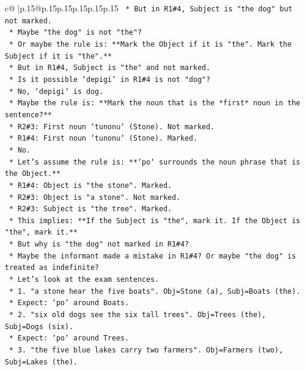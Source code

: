 \documentclass{article}
\begin{document}
{\begin{supertabular}{c@{$\;$}|p{.15\linewidth}@{}p{.15\linewidth}p{.15\linewidth}p{.15\linewidth}p{.15\linewidth}p{.15\linewidth}}
{{{\texttt{        *   But in R1\#4, Subject is "the dog" but not marked.} \\
\texttt{        *   Maybe "the dog" is not "the"?} \\
\texttt{        *   Or maybe the rule is: **Mark the Object if it is "the". Mark the Subject if it is "the".**} \\
\texttt{        *   But in R1\#4, Subject is "the" and not marked.} \\
\texttt{        *   Is it possible `depigi` in R1\#4 is not "dog"?} \\
\texttt{        *   No, `depigi` is dog.} \\
\texttt{        *   Maybe the rule is: **Mark the noun that is the *first* noun in the sentence?**} \\
\texttt{        *   R2\#3: First noun `tunonu` (Stone). Not marked.} \\
\texttt{        *   R1\#4: First noun `tunonu` (Stone). Marked.} \\
\texttt{        *   No.} \\
\texttt{        *   Let's assume the rule is: **`po` surrounds the noun phrase that is the Object.**} \\
\texttt{        *   R1\#4: Object is "the stone". Marked.} \\
\texttt{        *   R2\#3: Object is "a stone". Not marked.} \\
\texttt{        *   R2\#3: Subject is "the tree". Marked.} \\
\texttt{        *   This implies: **If the Subject is "the", mark it. If the Object is "the", mark it.**} \\
\texttt{        *   But why is "the dog" not marked in R1\#4?} \\
\texttt{        *   Maybe the informant made a mistake in R1\#4? Or maybe "the dog" is treated as indefinite?} \\
\texttt{        *   Let's look at the exam sentences.} \\
\texttt{        *   1. "a stone hear the five boats". Obj=Stone (a), Subj=Boats (the).} \\
\texttt{            *   Expect: `po` around Boats.} \\
\texttt{        *   2. "six old dogs see the six tall trees". Obj=Trees (the), Subj=Dogs (six).} \\
\texttt{            *   Expect: `po` around Trees.} \\
\texttt{        *   3. "the five blue lakes carry two farmers". Obj=Farmers (two), Subj=Lakes (the).} \\
}}}
\end{supertabular}}
\end{document}
